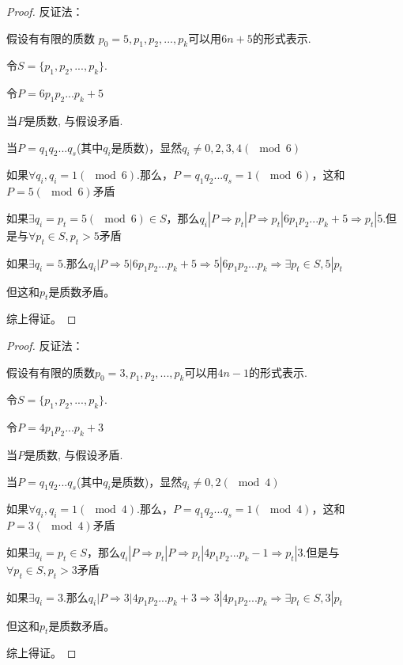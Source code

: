 \documentclass[a4paper, justified]{tufte-handout}
\begin{document}
\begin{problem}[TJ 2-29]
\end{problem}

\begin{proof}
  反证法：

  假设有有限的质数 $p_0=5,p_1,p_2,...,p_k$可以用$6n+5$的形式表示.

  令$S=\{p_1,p_2,...,p_k\}$.

  令$P=6p_1p_2...p_k+5$

  当$P$是质数, 与假设矛盾.

  当$P=q_1q_2...q_s$(其中$q_i$是质数)，显然$q_i \neq 0,2,3,4(\mod 6)$

  如果$\forall q_i,q_i=1(\mod 6).$那么，$P=q_1q_2...q_s=1(\mod 6)$，这和$P=5(\mod 6)$矛盾

  如果$\exists q_i=p_t=5(\mod 6) \in S$，那么$q_i|P\Rightarrow p_t|P \Rightarrow p_t|6p_1p_2...p_k+5 \Rightarrow p_t|5$.但是与$\forall p_t \in S, p_t >5$矛盾

  如果$\exists q_i=5.$那么$q_i|P\Rightarrow 5|6p_1p_2...p_k+5 \Rightarrow 5|6p_1p_2...p_k \Rightarrow \exists p_t \in S,5|p_t$

  但这和$p_t$是质数矛盾。

  综上得证。

\end{proof}

\begin{problem}[TJ 2-30]
\end{problem}

\begin{proof}
  反证法：

  假设有有限的质数$p_0=3,p_1,p_2,...,p_k$可以用$4n-1$的形式表示.

  令$S=\{p_1,p_2,...,p_k\}$.

  令$P=4p_1p_2...p_k+3$

  当$P$是质数, 与假设矛盾.

  当$P=q_1q_2...q_s$(其中$q_i$是质数)，显然$q_i \neq 0,2(\mod 4)$

  如果$\forall q_i,q_i=1(\mod 4).$那么，$P=q_1q_2...q_s=1(\mod 4)$，这和$P=3(\mod 4)$矛盾

  如果$\exists q_i=p_t\in S$，那么$q_i|P\Rightarrow p_t|P \Rightarrow p_t|4p_1p_2...p_k-1 \Rightarrow p_t|3$.但是与$\forall p_t \in S, p_t >3$矛盾

  如果$\exists q_i=3.$那么$q_i|P\Rightarrow 3|4p_1p_2...p_k+3 \Rightarrow 3|4p_1p_2...p_k \Rightarrow \exists p_t \in S,3|p_t$

  但这和$p_t$是质数矛盾。

  综上得证。
\end{proof}
\end{document}
